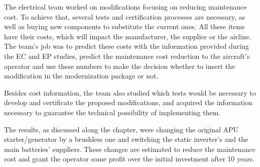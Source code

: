 ﻿%
The electrical team worked on modifications focusing on reducing maintenance cost. To achieve that, several tests and certification processes are necessary, as well as buying new components to substitute the current ones. All these items have their costs, which will impact the manufacturer, the supplier or the airline. The team's job was to predict these costs with the information provided during the EC and EP studies, predict the maintenance cost reduction to the aircraft's operator and use these numbers to make the decision whether to insert the modification in the modernization package or not.

Besides cost information, the team also studied which tests would be necessary to develop and certificate the proposed modifications, and acquired the information necessary to guarantee the technical possibility of implementing them.

The results, as discussed along the chapter, were changing the original APU starter/generator by a brushless one and switching the static inverter's and the main batteries' suppliers. These changes are estimated to reduce the maintenance cost and grant the operator some profit over the initial investment after 10 years.
